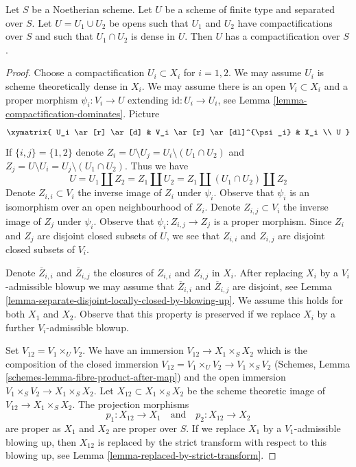 \begin{lemma}
\label{lemma-two-compactifications}
Let $S$ be a Noetherian scheme. Let $U$ be a scheme of finite type
and separated over $S$. Let $U = U_1 \cup U_2$ be opens such that
$U_1$ and $U_2$ have compactifications over $S$ and such that
$U_1 \cap U_2$ is dense in $U$. Then $U$ has a compactification over $S$.
\end{lemma}

\begin{proof}
Choose a compactification $U_i \subset X_i$ for $i = 1, 2$. We may
assume $U_i$ is scheme theoretically dense in $X_i$. We may assume there
is an open $V_i \subset X_i$ and a proper morphism
$\psi_i : V_i \to U$ extending $\text{id} : U_i \to U_i$, see
Lemma \ref{lemma-compactification-dominates}. Picture
$$
\xymatrix{
U_i \ar[r] \ar[d] & V_i \ar[r] \ar[dl]^{\psi_i} & X_i \\
U
}
$$
If $\{i, j\} = \{1, 2\}$ denote
$Z_i = U \setminus U_j = U_i \setminus (U_1 \cap U_2)$
and
$Z_j = U \setminus U_i = U_j \setminus (U_1 \cap U_2)$.
Thus we have
$$
U = U_1 \amalg Z_2 = Z_1 \amalg U_2 = Z_1 \amalg (U_1 \cap U_2) \amalg Z_2
$$
Denote $Z_{i, i} \subset V_i$ the inverse image of $Z_i$ under $\psi_i$.
Observe that $\psi_i$ is an isomorphism over an open neighbourhood of $Z_i$.
Denote $Z_{i, j} \subset V_i$ the inverse image of $Z_j$ under $\psi_i$.
Observe that $\psi_i : Z_{i, j} \to Z_j$ is a proper morphism.
Since $Z_i$ and $Z_j$ are disjoint closed subsets of
$U$, we see that $Z_{i, i}$ and $Z_{i, j}$ are disjoint closed subsets
of $V_i$.

\medskip\noindent
Denote $\overline{Z}_{i, i}$ and $\overline{Z}_{i, j}$ the closures of
$Z_{i, i}$ and $Z_{i, j}$ in $X_i$. After replacing $X_i$ by a
$V_i$-admissible blowup we may assume that
$\overline{Z}_{i, i}$ and $\overline{Z}_{i, j}$ are disjoint, see
Lemma \ref{lemma-separate-disjoint-locally-closed-by-blowing-up}.
We assume this holds for both $X_1$ and $X_2$.
Observe that this property is preserved if we replace $X_i$
by a further $V_i$-admissible blowup.

\medskip\noindent
Set $V_{12} = V_1 \times_U V_2$. We have an immersion
$V_{12} \to X_1 \times_S X_2$ which is the composition of the closed
immersion $V_{12} = V_1 \times_U V_2 \to V_1 \times_S V_2$
(Schemes, Lemma \ref{schemes-lemma-fibre-product-after-map})
and the open immersion $V_1 \times_S V_2 \to X_1 \times_S X_2$.
Let $X_{12} \subset X_1 \times_S X_2$ be the scheme theoretic
image of $V_{12} \to X_1 \times_S X_2$. The projection morphisms
$$
p_1 : X_{12} \to X_1
\quad\text{and}\quad
p_2 : X_{12} \to X_2
$$
are proper as $X_1$ and $X_2$ are proper over $S$. If we replace $X_1$ by a
$V_1$-admissible blowing up, then $X_{12}$ is replaced by
the strict transform with respect to this blowing up, see
Lemma \ref{lemma-replaced-by-strict-transform}.


\end{proof}
